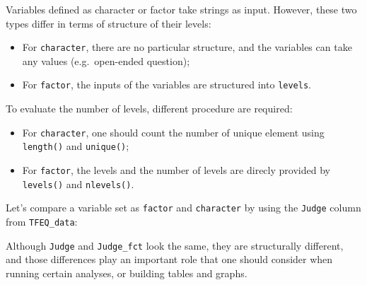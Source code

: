 \documentclass[
]{book}
\newenvironment{Shaded}{\begin{snugshade}}{\end{snugshade}}
\newcommand{\AttributeTok}[1]{\textcolor[rgb]{0.77,0.63,0.00}{#1}}
\newcommand{\FunctionTok}[1]{\textcolor[rgb]{0.00,0.00,0.00}{#1}}
\newcommand{\NormalTok}[1]{#1}
\newcommand{\OtherTok}[1]{\textcolor[rgb]{0.56,0.35,0.01}{#1}}
\newcommand{\SpecialCharTok}[1]{\textcolor[rgb]{0.00,0.00,0.00}{#1}}
\providecommand{\tightlist}{%
  \setlength{\itemsep}{0pt}\setlength{\parskip}{0pt}}
\begin{document}
Variables defined as character or factor take strings as input. However, these two types differ in terms of structure of their levels:

\begin{itemize}
\tightlist
\item
  For \texttt{character}, there are no particular structure, and the variables can take any values (e.g.~open-ended question);
\item
  For \texttt{factor}, the inputs of the variables are structured into \texttt{levels}.
\end{itemize}

To evaluate the number of levels, different procedure are required:

\begin{itemize}
\tightlist
\item
  For \texttt{character}, one should count the number of unique element using \texttt{length()} and \texttt{unique()};
\item
  For \texttt{factor}, the levels and the number of levels are direcly provided by \texttt{levels()} and \texttt{nlevels()}.
\end{itemize}

Let's compare a variable set as \texttt{factor} and \texttt{character} by using the \texttt{Judge} column from \texttt{TFEQ\_data}:

\begin{Shaded}
\end{Shaded}

Although \texttt{Judge} and \texttt{Judge\_fct} look the same, they are structurally different, and those differences play an important role that one should consider when running certain analyses, or building tables and graphs.
\end{document}
